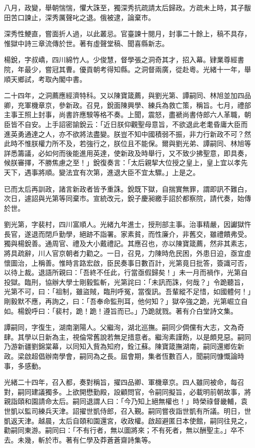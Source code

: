 \begin{pinyinscope}
八月，政變，舉朝惴惴，懼大誅至，獨深秀抗疏請太后歸政。方疏未上時，其子黻田苦口諫止，深秀厲聲叱之退。俄被逮，論棄市。

深秀性鯁直，嘗面折人過，以此叢忌。官臺諫十閱月，封事二十餘上，稿不具存，惟獄中詩三章流傳於世。著有虛聲堂稿、聞喜縣新志。

楊銳，字叔嶠，四川綿竹人。少俊慧，督學張之洞奇其才，招入幕。肄業尊經書院，年最少，嘗冠其曹。優貢朝考得知縣。之洞督兩廣，從赴粵。光緒十一年，舉順天鄉試，考取內閣中書。

二十四年，之洞薦應經濟特科。又以陳寶箴薦，與劉光第、譚嗣同、林旭並加四品卿，充軍機章京，參新政。召見，銳面陳興學、練兵為救亡策，稱旨。七月，禮部主事王照上封事，尚書許應騤等格不奏。上聞，震怒，盡褫尚書侍郎六人革職，朝臣皆不自安。上手詔密諭銳云：「近日朕仰觀聖母意旨，不欲退此老耄昏庸大臣而進英勇通達之人，亦不欲將法盡變。朕豈不知中國積弱不振，非力行新政不可？然此時不惟朕權力所不及，若強行之，朕位且不能保。爾與劉光弟、譚嗣同、林旭等詳悉籌議，必如何而後能進用英達，使新政及時舉行，又不致少拂聖意，即具奏，候朕審擇，不勝焦慮之至！」銳復奏言：「太后親挈大位授之皇上，皇上宜以孝先天下，遇事將順。變法宜有次第，進退大臣不宜太驟。」上是之。

已而太后再訓政，諸言新政者皆予重誅。銳既下獄，自揣實無罪，謂即訊不難白，次日，遽詔與光第等同棄市。宣統改元，銳子慶昶繳手詔於都察院，請代奏，始傳於世。

劉光第，字裴村，四川富順人。光緒九年進士，授刑部主事。治事精嚴，因讞獄忤長官，遂退而閉戶勤學，絕跡不詣署。家素貧，而性廉介，非舊交，雖禮饋弗受。獨與楊銳善。通周官、禮及大小戴禮記。其應召也，亦以陳寶箴薦，然非其素志，將具疏辭，川人官京朝者力勸之。一日，召見，力陳時危民困，外患日迫，亟宜虛懷圖治，上稱善。惟時言路宏啟，臣民奏事日數百計，光第竟日批答，簽識可否，以待上裁。退語所親曰：「吾終不任此，行當亟假歸矣！」未一月而禍作，光第自投獄。臨刑，協辦大學士剛毅監斬，光第詫曰：「未訊而誅，何哉？」令跪聽旨，光第不可，曰：「祖制，雖盜賊，臨刑呼冤，當復訊。吾輩縱不足惜，如國體何！」剛毅默不應，再詢之，曰：「吾奉命監刑耳，他何知？」獄卒強之跪，光第崛立自如。楊銳呼曰：「裴村，跪！跪！遵旨而已。」乃跪就戮。著有介白堂詩文集。

譚嗣同，字復生，湖南瀏陽人。父繼洵，湖北巡撫。嗣同少倜儻有大志，文為奇肆。其學以日新為主，視倫常舊說若無足措意者。繼洵素謹飭，以是頗見惡。嗣同乃游新疆劉錦棠幕，以同知入貲為知府，銓江蘇。陳寶箴撫湖南，嗣同還鄉佐新政。梁啟超倡辦南學會，嗣同為之長。屆會期，集者恆數百人，聞嗣同慷慨論時事，多感動。

光緒二十四年，召入都，奏對稱旨，擢四品卿、軍機章京。四人雖同被命，每召對，嗣同建議獨多。上欲開懋勤殿，設顧問官，令嗣同擬旨，必載明前朝故事，將親詣頤和園請命太后。嗣同退謂人曰：「今乃知上絕無權也！」時榮祿督畿輔，袁世凱以監司練兵天津。詔擢世凱侍郎，召入覲。嗣同嘗夜詣世凱有所議。明日，世凱返天津。越晨，太后自頤和園還宮，收政權。啟超避匿日本使館，嗣同往見之，勸嗣同東游。嗣同曰：「不有行者，無以圖將來；不有死者，無以酬聖主。」卒不去。未幾，斬於市。著有仁學及莽蒼蒼齋詩集等。


\end{pinyinscope}
